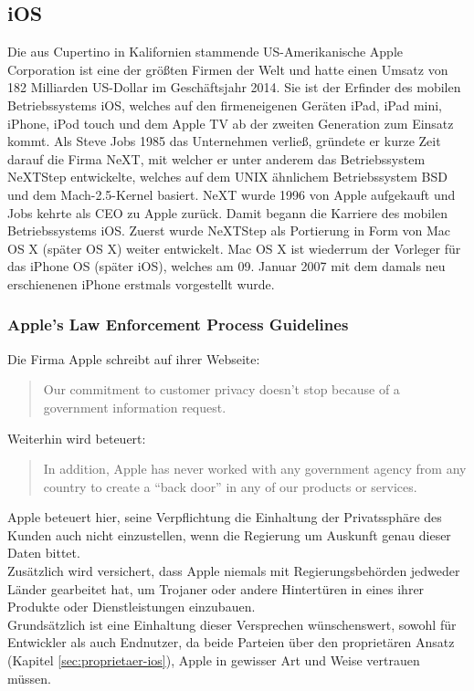 \subsection{iOS}
	Die aus Cupertino in Kalifornien stammende US-Amerikanische Apple Corporation
	ist eine der größten Firmen der Welt und hatte einen Umsatz von 182 Milliarden
	US-Dollar im Geschäftsjahr 2014. Sie ist der Erfinder des mobilen
	Betriebssystems iOS, welches auf den firmeneigenen Geräten iPad, iPad mini,
	iPhone, iPod touch und dem Apple TV ab der zweiten Generation zum Einsatz
	kommt. Als Steve Jobs 1985 das Unternehmen verließ, gründete er
	kurze Zeit darauf die Firma NeXT, mit welcher er unter anderem das
	Betriebssystem NeXTStep entwickelte, welches auf dem UNIX ähnlichem
	Betriebssystem BSD\cite[S.12]{Tanenbaum2009} und dem Mach-2.5-Kernel
	\cite{MachProject2015} basiert. NeXT wurde 1996 von Apple aufgekauft und Jobs
	kehrte als CEO zu Apple zurück. Damit begann die Karriere des mobilen
	Betriebssystems iOS. Zuerst wurde NeXTStep als Portierung in Form von Mac OS X
	(später OS X) weiter entwickelt. Mac OS X ist wiederrum der Vorleger für das
	iPhone OS (später iOS), welches am 09. Januar 2007 mit dem damals neu
	erschienenen iPhone erstmals vorgestellt wurde.
	
	\subsubsection{Apple's Law Enforcement Process Guidelines}
		Die Firma Apple schreibt auf ihrer Webseite:
		\begin{quote}
			Our commitment to customer privacy doesn't stop because of a government
			information request.\cite{AppleGovInfo2015}
		\end{quote}
		Weiterhin wird beteuert:
		\begin{quote}
			In addition, Apple has never worked with any government agency from any
			country to create a "`back door"' in any of our products or
			services.\cite{AppleGovInfo2015}
		\end{quote}
		Apple beteuert hier, seine Verpflichtung die Einhaltung der Privatssphäre des
		Kunden auch nicht einzustellen, wenn die Regierung um Auskunft genau dieser
		Daten bittet.\\
		Zusätzlich wird versichert, dass Apple niemals mit Regierungsbehörden
		jedweder Länder gearbeitet hat, um Trojaner oder andere Hintertüren in eines
		ihrer Produkte oder Dienstleistungen einzubauen.\\
		Grundsätzlich ist eine Einhaltung dieser Versprechen wünschenswert, sowohl für
		Entwickler als auch Endnutzer, da beide Parteien über den proprietären
		Ansatz (Kapitel \ref{sec:proprietaer-ios}), Apple in gewisser Art und Weise
		vertrauen müssen.
